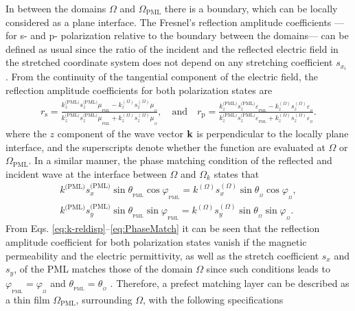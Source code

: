     In between the domains $\Omega$ and $\Omega_\text{PML}$ there is a boundary, which can be locally considered as a plane interface. The Fresnel's reflection amplitude coefficients ---for s- and p- polarization relative to the boundary between the domains--- can be defined as usual since the ratio of the incident and the reflected electric field in the stretched coordinate system does not depend on any stretching coefficient $s_{x_i}$ \cite{jin_theory_2010,chew_complex_1997}. From the continuity of the tangential component of the electric field, the reflection amplitude coefficients for both polarization states are \cite{jackson_classical_1999}
    \begin{align}
       r_\text{s} = \frac{k^\text{(PML)}_z s^\text{(PML)}_z\mu_{{}_\text{PML}} - k^{(\Omega)}_z s^{(\Omega)}_z\mu_{{}_\Omega}}
                        {k^\text{(PML)}_z s^\text{(PML)}_z\mu_{{}_\text{PML}} + k^{(\Omega)}_z s^{(\Omega)}_z\mu_{{}_\Omega}},
           \quad
           \text{and}
           \quad
       r_\text{p} = \frac{k^\text{(PML)}_z s^\text{(PML)}_z\varepsilon_{{}_\text{PML}} - k^{(\Omega)}_z s^{(\Omega)}_z\varepsilon_{{}_\Omega}}
                        {k^\text{(PML)}_z s^\text{(PML)}_z\varepsilon_{{}_\text{PML}} + k^{(\Omega)}_z s^{(\Omega)}_z\varepsilon_{{}_\Omega}}.
       \label{eq:refl-Fresnel}
    \end{align}
   where the $z$ component of the wave vector $\vb{k}$ is perpendicular to the locally plane interface, and the superscripts denote whether the function are evaluated at $\Omega$ or $\Omega_\text{PML}$. In a similar manner, the phase matching condition of the reflected and incident wave at the interface between $\Omega$ and $\Omega_k$ states that \cite{jin_theory_2010}
   \begin{subequations}
       \label{eq:PhaseMatch}
    \begin{align}
       k^\text{(PML)} s^\text{(PML)}_x \sin\theta_{{}_\text{PML}}\cos\varphi_{{}_\text{PML}} =
                        k^{(\Omega)} s^{(\Omega)}_x \sin\theta_{{}_\Omega}\cos\varphi_{{}_\Omega},\\
        k^\text{(PML)} s^\text{(PML)}_y \sin\theta_{{}_\text{PML}}\sin\varphi_{{}_\text{PML}} =
                     k^{(\Omega)} s^{(\Omega)}_y \sin\theta_{{}_\Omega}\sin\varphi_{{}_\Omega}.
    \end{align}
    \end{subequations}
    \noindent
   From Eqs. \eqref{eq:k-reldisp}--\eqref{eq:PhaseMatch} it can be seen that the reflection amplitude coefficient for both polarization states vanish if the magnetic permeability and the electric permittivity, as well as the stretch coefficient $s_x$ and $s_y$, of the PML matches those of the domain $\Omega$ since such conditions leads to  $\varphi_{{}_\text{PML}} = \varphi_{{}_\Omega}$ and  $\theta_{{}_\text{PML}} = \theta_{{}_\Omega}$ \cite{jin_theory_2010}. Therefore, a prefect matching layer can be described as a thin film $\Omega_\text{PML}$, surrounding $\Omega$, with the following specifications

